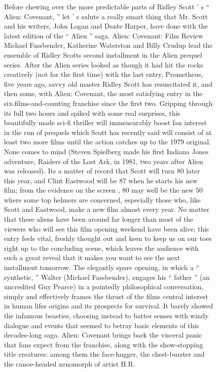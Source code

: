 \documentclass[../writeup.tex]{subfiles}
\begin{document}
\begin{figure}[h]
    \centering
    {\small Before chewing over the more predictable parts of Ridley Scott ’ s “ Alien: Covenant, ” let ’ s salute a really smart thing that Mr. Scott and his writers, John Logan and Dante Harper, have done with the latest edition of the “ Alien ” saga.
        Alien: Covenant: Film Review Michael Fassbender, Katherine Waterston and Billy Crudup lead the ensemble of Ridley Scotts second installment in the Alien prequel series.
        After the Alien series looked as though it had hit the rocks creatively (not for the first time) with the last entry, Prometheus, five years ago, savvy old master Ridley Scott has resuscitated it, and then some, with Alien: Covenant, the most satisfying entry in the six-films-and-counting franchise since the first two.
        Gripping through its full two hours and spiked with some real surprises, this beautifully made sci-fi thriller will immeasurably boost fan interest in the run of prequels which Scott has recently said will consist of at least two more films until the action catches up to the 1979 original.
        None comes to mind (Steven Spielberg made his first Indiana Jones adventure, Raiders of the Lost Ark, in 1981, two years after Alien was released).
        Its a matter of record that Scott will turn 80 later this year, and Clint Eastwood will be 87 when he starts his new film; from the evidence on the screen , 80 may well be the new 50 where some top helmers are concerned, especially those who, like Scott and Eastwood, make a new film almost every year.
        No matter that these aliens have been around far longer than most of the viewers who will see this film opening weekend have been alive; this entry feels vital, freshly thought out and keen to keep us on our toes right up to the concluding scene, which leaves the audience with such a great reveal that it makes you want to see the next installment tomorrow.
        The elegantly spare opening, in which a “ synthetic, ” Walter (Michael Fassbender), engages his “ father ” (an uncredited Guy Pearce) in a pointedly philosophical conversation, simply and effectively frames the thrust of the films central interest in human lifes origins and its prospects for survival.
        It barely showed the infamous beasties, choosing instead to batter senses with windy dialogue and events that seemed to betray basic elements of this decades-long saga.
        Alien: Covenant brings back the visceral panic that fans expect from the franchise, along with the show-stopping title creatures: among them the face-hugger, the chest-burster and the canoe-headed xenomorph of artist H.R.
}
\end{figure}
\end{document}
